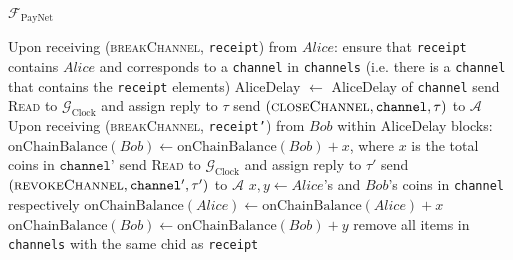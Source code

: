 \begin{functionality}{$\mathcal{F}_{\mathrm{PayNet}}$}
\begin{algorithmic}[1]
    \State Upon receiving (\textsc{breakChannel}, \texttt{receipt}) from $Alice$:
    \Indent
      \State ensure that \texttt{receipt} contains $Alice$ and corresponds to a
      \texttt{channel} in \texttt{channels} (i.e. there is a \texttt{channel}
      that contains the \texttt{receipt} elements)
      \State AliceDelay $\gets$ AliceDelay of \texttt{channel}
      \State send \textsc{Read} to $\mathcal{G}_{\mathrm{Clock}}$ and assign
      reply to $\tau$
      \State send $\left(\textsc{closeChannel}, \mathtt{channel},
      \tau\right)$ to $\mathcal{A}$
      \State Upon receiving (\textsc{breakChannel}, \texttt{receipt'}) from
      $Bob$ within AliceDelay blocks: 
        \State $\mathrm{onChainBalance}\left(Bob\right) \gets
        \mathrm{onChainBalance}\left(Bob\right) + x$, where $x$ is the total
        coins in $\texttt{channel'}$
        \State send \textsc{Read} to $\mathcal{G}_{\mathrm{Clock}}$ and assign
        reply to $\tau'$
        \State send $\left(\textsc{revokeChannel}, \mathtt{channel'},
        \tau'\right)$ to $\mathcal{A}$
      \Else
        \State $x, y \gets Alice$'s and $Bob$'s coins in \texttt{channel}
        respectively
        \State $\mathrm{onChainBalance}\left(Alice\right) \gets
        \mathrm{onChainBalance}\left(Alice\right) + x$
        \State $\mathrm{onChainBalance}\left(Bob\right) \gets
        \mathrm{onChainBalance}\left(Bob\right) + y$
      \EndIf
      \State remove all items in \texttt{channels} with the same chid as
      \texttt{receipt}
    \EndIndent
  \end{algorithmic}
\end{functionality}
